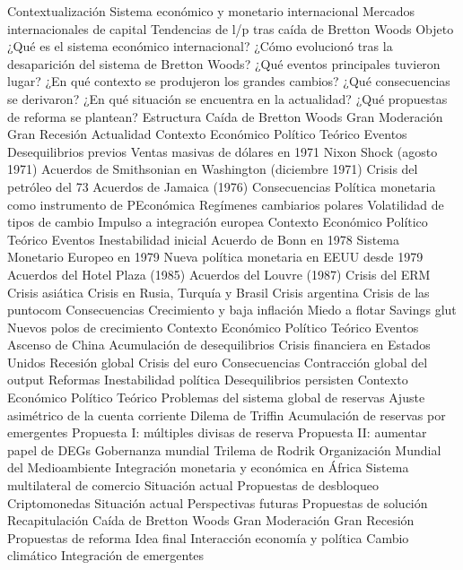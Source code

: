 \documentclass{nuevotema}
\begin{document}
\begin{esquema}[enumerate]
	\1[] 
		\2 Contextualización
			\3 Sistema económico y monetario internacional
			\3 Mercados internacionales de capital
			\3 Tendencias de l/p tras caída de Bretton Woods
		\2 Objeto
			\3 ¿Qué es el sistema económico internacional?
			\3 ¿Cómo evolucionó tras la desaparición del sistema de Bretton Woods?
			\3 ¿Qué eventos principales tuvieron lugar?
			\3 ¿En qué contexto se produjeron los grandes cambios?
			\3 ¿Qué consecuencias se derivaron?
			\3 ¿En qué situación se encuentra en la actualidad?
			\3 ¿Qué propuestas de reforma se plantean?
		\2 Estructura
			\3 Caída de Bretton Woods
			\3 Gran Moderación
			\3 Gran Recesión
			\3 Actualidad
	\1 
		\2 Contexto
			\3 Económico
			\3 Político
			\3 Teórico
		\2 Eventos
			\3 Desequilibrios previos
			\3 Ventas masivas de dólares en 1971
			\3 Nixon Shock (agosto 1971)
			\3 Acuerdos de Smithsonian en Washington (diciembre 1971)
			\3 Crisis del petróleo del 73
			\3 Acuerdos de Jamaica (1976)
		\2 Consecuencias
			\3 Política monetaria como instrumento de PEconómica
			\3 Regímenes cambiarios polares
			\3 Volatilidad de tipos de cambio
			\3 Impulso a integración europea
	\1 
		\2 Contexto
			\3 Económico
			\3 Político
			\3 Teórico
		\2 Eventos
			\3 Inestabilidad inicial
			\3 Acuerdo de Bonn en 1978
			\3 Sistema Monetario Europeo en 1979
			\3 Nueva política monetaria en EEUU desde 1979
			\3 Acuerdos del Hotel Plaza (1985)
			\3 Acuerdos del Louvre (1987)
			\3 Crisis del ERM
			\3 Crisis asiática
			\3 Crisis en Rusia, Turquía y Brasil
			\3 Crisis argentina
			\3 Crisis de las puntocom
		\2 Consecuencias
			\3 Crecimiento y baja inflación
			\3 Miedo a flotar
			\3 Savings glut
			\3 Nuevos polos de crecimiento
	\1 
		\2 Contexto
			\3 Económico
			\3 Político
			\3 Teórico
		\2 Eventos
			\3 Ascenso de China
			\3 Acumulación de desequilibrios
			\3 Crisis financiera en Estados Unidos
			\3 Recesión global
			\3 Crisis del euro
		\2 Consecuencias
			\3 Contracción global del output
			\3 Reformas
			\3 Inestabilidad política
			\3 Desequilibrios persisten
	\1 
		\2 Contexto
			\3 Económico
			\3 Político
			\3 Teórico
		\2 Problemas del sistema global de reservas
			\3 Ajuste asimétrico de la cuenta corriente
			\3 Dilema de Triffin
			\3 Acumulación de reservas por emergentes
			\3 Propuesta I: múltiples divisas de reserva
			\3 Propuesta II: aumentar papel de DEGs
		\2 Gobernanza mundial
			\3 Trilema de Rodrik
			\3 Organización Mundial del Medioambiente
			\3 Integración monetaria y económica en África
		\2 Sistema multilateral de comercio
			\3 Situación actual
			\3 Propuestas de desbloqueo
		\2 Criptomonedas
			\3 Situación actual
			\3 Perspectivas futuras
			\3 Propuestas de solución
	\1[] 
		\2 Recapitulación
			\3 Caída de Bretton Woods
			\3 Gran Moderación
			\3 Gran Recesión
			\3 Propuestas de reforma
		\2 Idea final
			\3 Interacción economía y política
			\3 Cambio climático
			\3 Integración de emergentes

\end{esquema}
\end{document}
